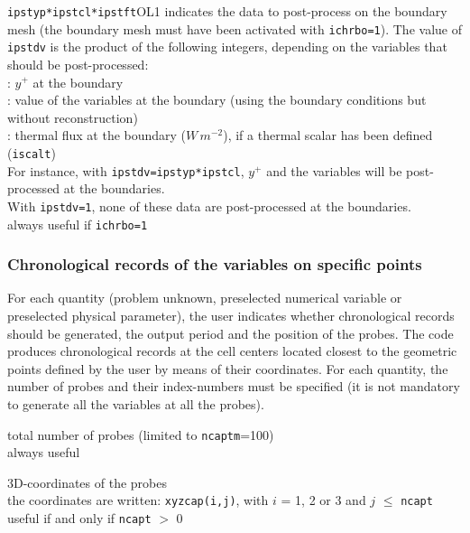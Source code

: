 {{\tt ipstyp*ipstcl*ipstft}}{O}{L1}
{indicates the data to post-process on the boundary mesh (the boundary mesh must
have been activated with {\tt ichrbo=1}). The value of {\tt ipstdv} is
the product of the following integers, depending on the variables that should be
post-processed:\\
\hspace*{1.3cm}{\tt ipstyp}: $y^+$ at the boundary\\
\hspace*{1.3cm}{\tt ipstcl}: value of the variables at the
boundary (using the boundary conditions but without reconstruction)\\
\hspace*{1.3cm}{\tt ipstft}: thermal flux at the boundary
($W\,m^{-2}$), if a thermal scalar has been defined ({\tt iscalt})\\
For instance, with {\tt ipstdv=ipstyp*ipstcl}, $y^+$ and the variables will be
post-processed at the boundaries.\\
With {\tt ipstdv=1}, none of these data are post-processed at the boundaries.\\
always useful if {\tt ichrbo=1}}

\subsubsection{Chronological records of the variables on specific points}

For each quantity (problem unknown, preselected numerical variable or
preselected physical parameter), the user indicates whether chronological records
should be generated, the output period and the position of the
probes. The code produces chronological records at the cell centers located
closest to the geometric points defined by the user by means of their
coordinates. For each quantity, the number of probes and their
index-numbers must be specified (it is not mandatory to generate all
the variables at all the probes).


{total number of probes (limited to {\tt ncaptm}=100)\\
always useful }

{3D-coordinates of the probes\\
the coordinates are written: {\tt xyzcap(i,j)}, with $i$ = 1, 2 or 3 and $j$
$\leqslant$ {\tt ncapt}\\
useful if and only if {\tt ncapt} $>$ 0}

